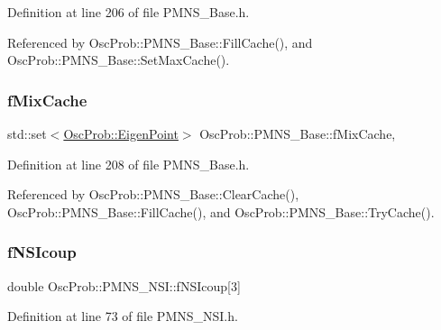 Definition at line 206 of file P\+M\+N\+S\+\_\+\+Base.\+h.



Referenced by Osc\+Prob\+::\+P\+M\+N\+S\+\_\+\+Base\+::\+Fill\+Cache(), and Osc\+Prob\+::\+P\+M\+N\+S\+\_\+\+Base\+::\+Set\+Max\+Cache().

\mbox{\label{classOscProb_1_1PMNS__Base_a8159424f20197a3a7145fe3bf2c11176}} 
\subsubsection{\texorpdfstring{f\+Mix\+Cache}{fMixCache}}
{\footnotesize\ttfamily std\+::set$<$\hyperlink{structOscProb_1_1EigenPoint}{Osc\+Prob\+::\+Eigen\+Point}$>$ Osc\+Prob\+::\+P\+M\+N\+S\+\_\+\+Base\+::f\+Mix\+Cache\hspace{0.3cm}{\ttfamily [protected]}, {\ttfamily [inherited]}}



Definition at line 208 of file P\+M\+N\+S\+\_\+\+Base.\+h.



Referenced by Osc\+Prob\+::\+P\+M\+N\+S\+\_\+\+Base\+::\+Clear\+Cache(), Osc\+Prob\+::\+P\+M\+N\+S\+\_\+\+Base\+::\+Fill\+Cache(), and Osc\+Prob\+::\+P\+M\+N\+S\+\_\+\+Base\+::\+Try\+Cache().

\mbox{\label{classOscProb_1_1PMNS__NSI_a1ac51957bbc4cec9fcfd8f816491cc95}} 
\subsubsection{\texorpdfstring{f\+N\+S\+Icoup}{fNSIcoup}}
{\footnotesize\ttfamily double Osc\+Prob\+::\+P\+M\+N\+S\+\_\+\+N\+S\+I\+::f\+N\+S\+Icoup\mbox{[}3\mbox{]}\hspace{0.3cm}{\ttfamily [protected]}}



Definition at line 73 of file P\+M\+N\+S\+\_\+\+N\+S\+I.\+h.



